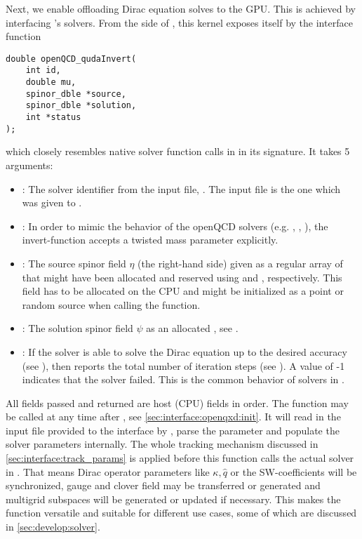Next, we enable offloading Dirac equation solves to the GPU.
This is achieved by interfacing \quda's solvers.
From the side of \openqxd, this kernel exposes itself by the interface function
\begin{verbatim}
double openQCD_qudaInvert(
    int id,
    double mu,
    spinor_dble *source,
    spinor_dble *solution,
    int *status
);
\end{verbatim}
which closely resembles native solver function calls in \openqxd in its signature.
It takes \num{5} arguments:
\begin{itemize}
  \item {}: The solver identifier from the input file, \ie {}. The input file is the one which was given to .
  \item {}: In order to mimic the behavior of the openQCD solvers (e.g. , , ), the invert-function accepts a twisted mass parameter  explicitly.
  \item {}: The source spinor field $\eta$ (the right-hand side) given as a regular \openqxd array of  that might have been allocated and reserved using  and , respectively. This field has to be allocated on the CPU and might be initialized as a point or random source when calling the function.
  \item {}: The solution spinor field $\psi$ as an allocated , see .
  \item {}: If the solver is able to solve the Dirac equation up to the desired accuracy (see ), then  reports the total number of iteration steps (see ). A value of -1 indicates that the solver failed. This is the common behavior of solvers in \openqxd.
\end{itemize}

All fields passed and returned are host (CPU) fields in \openqxd order.
The function may be called at any time after , see \cref{sec:interface:openqxd:init}.
It will read in the input file provided to the interface by , parse the parameter and populate the solver parameters internally.
The whole tracking mechanism discussed in \cref{sec:interface:track_params} is applied before this function calls the actual solver in \quda.
That means Dirac operator parameters like $\kappa, \hat{q}$ or the SW-coefficients will be synchronized, gauge and clover field may be transferred or generated and multigrid subspaces will be generated or updated if necessary.
This makes the function versatile and suitable for different use cases, some of which are discussed in \cref{sec:develop:solver}.

